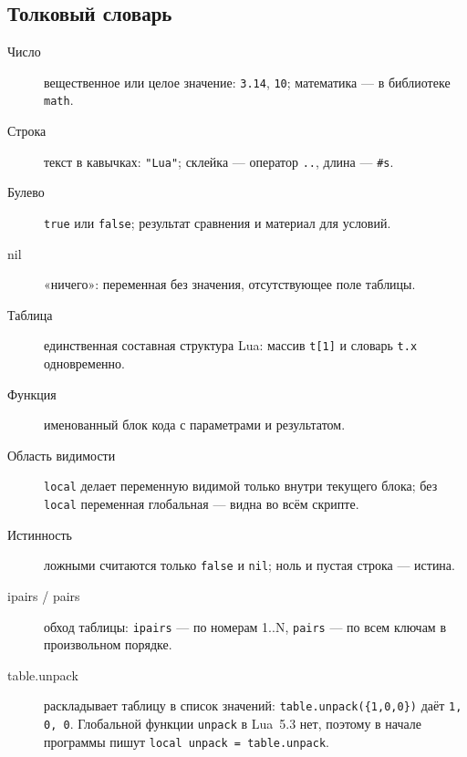 \subsection{Толковый словарь}
\begin{description}
  \item[\hypertarget{term:number}{Число}] вещественное или целое значение: \verb|3.14|, \verb|10|; математика --- в библиотеке \verb|math|.
  \item[\hypertarget{term:string}{Строка}] текст в кавычках: \verb|"Lua"|; склейка --- оператор \verb|..|, длина --- \verb|#s|.
  \item[\hypertarget{term:boolean}{Булево}] \verb|true| или \verb|false|; результат сравнения и материал для условий.
  \item[\hypertarget{term:nil}{nil}] «ничего»: переменная без значения, отсутствующее поле таблицы.
  \item[\hypertarget{term:table}{Таблица}] единственная составная структура Lua: массив \verb|t[1]| и словарь \verb|t.x| одновременно.
  \item[\hypertarget{term:function}{Функция}] именованный блок кода с параметрами и результатом.
  \item[\hypertarget{term:scope}{Область видимости}] \verb|local| делает переменную видимой только внутри текущего блока; без \verb|local| переменная глобальная --- видна во всём скрипте.
  \item[\hypertarget{term:truthiness}{Истинность}] ложными считаются только \verb|false| и \verb|nil|; ноль и пустая строка --- истина.
  \item[\hypertarget{term:ipairs}{ipairs / pairs}] обход таблицы: \verb|ipairs| --- по номерам 1..N, \verb|pairs| --- по всем ключам в произвольном порядке.
  \item[\hypertarget{term:unpack}{table.unpack}] раскладывает таблицу в список значений: \verb|table.unpack({1,0,0})| даёт \verb|1, 0, 0|. Глобальной функции \verb|unpack| в Lua~5.3 нет, поэтому в начале программы пишут \verb|local unpack = table.unpack|.
\end{description}
